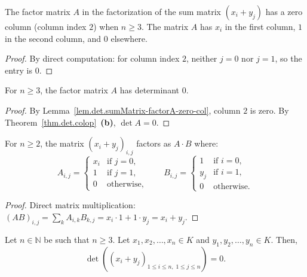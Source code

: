 \begin{lemma}
\label{lem.det.sumMatrix-factorA-zero-col}
\leanhelper
\leanok
The factor matrix $A$ in the factorization of the sum matrix $(x_i + y_j)$
has a zero column (column index $2$) when $n \geq 3$.
The matrix $A$ has $x_i$ in the first column, $1$ in the second column,
and $0$ elsewhere.
\end{lemma}

\begin{proof}
\leanok
By direct computation: for column index $2$, neither $j = 0$ nor $j = 1$, so the entry is $0$.
\end{proof}

\begin{lemma}
\label{lem.det.det-sumMatrix-factorA-zero}
\leanhelper
\leanok
For $n \geq 3$, the factor matrix $A$ has determinant $0$.
\end{lemma}

\begin{proof}
\leanok
By Lemma~\ref{lem.det.sumMatrix-factorA-zero-col}, column $2$ is zero.
By Theorem~\ref{thm.det.colop}~\textbf{(b)}, $\det A = 0$.
\end{proof}

\begin{lemma}
\label{lem.det.sumMatrix-eq-factorA-mul-factorB}
\leanhelper
\leanok
For $n \geq 2$, the matrix $(x_i + y_j)_{i,j}$ factors as $A \cdot B$ where:
\[
A_{i,j} = \begin{cases} x_i & \text{if } j = 0, \\ 1 & \text{if } j = 1, \\ 0 & \text{otherwise,} \end{cases}
\qquad
B_{i,j} = \begin{cases} 1 & \text{if } i = 0, \\ y_j & \text{if } i = 1, \\ 0 & \text{otherwise.} \end{cases}
\]
\end{lemma}

\begin{proof}
\leanok
Direct matrix multiplication: $(AB)_{i,j} = \sum_k A_{i,k} B_{k,j} = x_i \cdot 1 + 1 \cdot y_j = x_i + y_j$.
\end{proof}

\begin{proposition}
\label{prop.det.xi+yj}
\leantarget
\leanok
Let $n \in \mathbb{N}$ be such that $n \geq 3$. Let
$x_1, x_2, \ldots, x_n \in K$ and $y_1, y_2, \ldots, y_n \in K$. Then,
\[
  \det\left( \left( x_i + y_j \right)_{1 \leq i \leq n,\; 1 \leq j \leq n} \right) = 0.
\]
\end{proposition}

